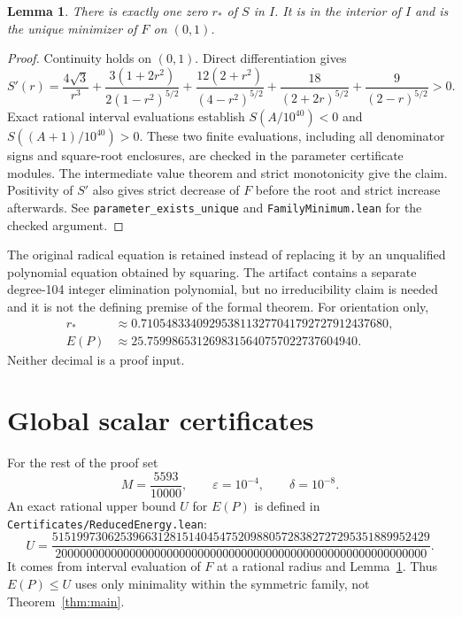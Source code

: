 \documentclass[11pt]{article}
\newtheorem{lemma}[theorem]{Lemma}
\theoremstyle{remark}
\newcommand{\code}[1]{{\small\nolinkurl{#1}}}
\newcommand{\pathcode}[1]{\nolinkurl{#1}}
\begin{document}
\begin{lemma}\label{lem:parameter}
There is exactly one zero $r_*$ of $S$ in $I$. It is in the interior of $I$
and is the unique minimizer of $F$ on $(0,1)$.
\end{lemma}
\begin{proof}
Continuity holds on $(0,1)$. Direct differentiation gives
\[
 S'(r)=\frac{4\sqrt3}{r^3}
 +\frac{3(1+2r^2)}{2(1-r^2)^{5/2}}
 +\frac{12(2+r^2)}{(4-r^2)^{5/2}}
 +\frac{18}{(2+2r)^{5/2}}+\frac9{(2-r)^{5/2}}>0.
\]
Exact rational interval evaluations establish $S(A/10^{40})<0$ and
$S((A+1)/10^{40})>0$. These two finite evaluations, including all denominator
signs and square-root enclosures, are checked in the parameter certificate
modules. The intermediate value theorem and strict monotonicity give the
claim. Positivity of $S'$ also gives strict decrease of $F$ before the root
and strict increase afterwards. See \code{parameter_exists_unique} and
\pathcode{FamilyMinimum.lean} for the checked argument.
\end{proof}

The original radical equation is retained instead of replacing it by an
unqualified polynomial equation obtained by squaring. The artifact contains
a separate degree-104 integer elimination polynomial, but no irreducibility
claim is needed and it is not the defining premise of the formal theorem.
For orientation only,
\begin{align*}
 r_*&\approx0.7105483340929538113277041792727912437680,\\
 E(P)&\approx25.7599865312698315640757022737604940.
\end{align*}
Neither decimal is a proof input.

\section{Global scalar certificates}\label{sec:scalar}
For the rest of the proof set
\[
 M=\frac{5593}{10000},\qquad \varepsilon=10^{-4},\qquad\delta=10^{-8}.
\]
An exact rational upper bound $U$ for $E(P)$ is defined in
\pathcode{Certificates/ReducedEnergy.lean}:
\[
 U=\frac{
 5151997306253966312815140454752098805728382727295351889952429}
 {200000000000000000000000000000000000000000000000000000000000}.
\]
It comes from interval evaluation of $F$ at a rational radius and
Lemma~\ref{lem:parameter}. Thus $E(P)\le U$ uses only minimality within the
symmetric family, not Theorem~\ref{thm:main}.
\end{document}
